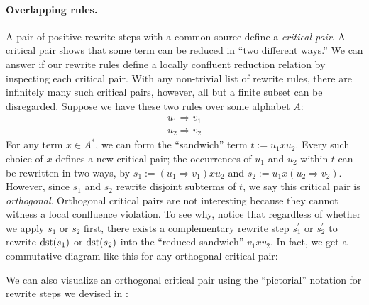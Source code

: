 \documentclass[../generics]{subfiles}
\begin{document}
\paragraph{Overlapping rules.} A pair of positive rewrite steps with a common source define a \emph{critical pair}. A critical pair shows that some term can be reduced in ``two different ways.'' We can answer if our rewrite rules define a locally confluent reduction relation by inspecting each critical pair. With any non-trivial list of rewrite rules, there are infinitely many such critical pairs, however, all but a finite subset can be disregarded. Suppose we have these two rules over some alphabet $A$:
\begin{gather*}
u_1\Rightarrow v_1\\
u_2\Rightarrow v_2
\end{gather*}
For any term $x\in A^*$, we can form the ``sandwich'' term $t := u_1xu_2$. Every such choice of $x$ defines a new critical pair; the occurrences of $u_1$ and $u_2$ within $t$ can be rewritten in two ways, by $s_1 := (u_1\Rightarrow v_1)xu_2$ and $s_2 := u_1x(u_2\Rightarrow v_2)$. However, since $s_1$ and $s_2$ rewrite disjoint subterms of $t$, we say this critical pair is \emph{orthogonal}. Orthogonal critical pairs are not interesting because they cannot witness a local confluence violation. To see why, notice that regardless of whether we apply $s_1$ or $s_2$ first, there exists a complementary rewrite step $s_1^\prime$ or $s_2^\prime$ to rewrite $\operatorname{dst}(s_1)$ or $\operatorname{dst}(s_2)$ into the ``reduced sandwich'' $v_1xv_2$. In fact, we get a commutative diagram like this for any orthogonal critical pair:
\begin{center}
\end{center}
We can also visualize an orthogonal critical pair using the ``pictorial'' notation for rewrite steps we devised in :
\end{document}
